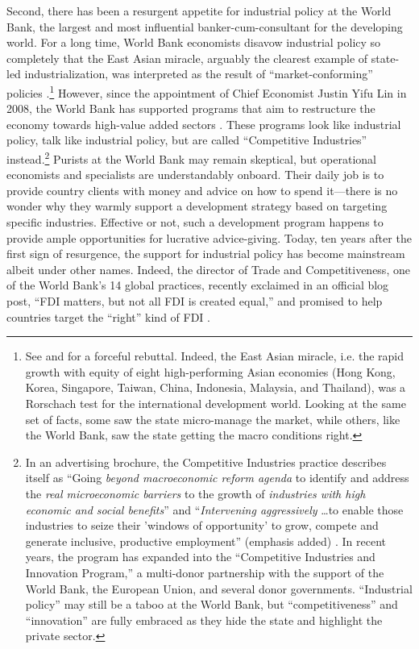 Second, there has been a resurgent appetite for industrial policy at the World
Bank, the largest and most influential banker-cum-consultant for the developing
world. For a long time, World Bank economists disavow industrial policy so
completely that the East Asian miracle, arguably the clearest example of
state-led industrialization, was interpreted as the result of
``market-conforming'' policies \citep[355]{WorldBank1993}.\footnote{See
  \citet{Amsden1994} and \citet{Rodrik1994} for a forceful rebuttal. Indeed, the
  East Asian miracle, i.e. the rapid growth with equity of eight high-performing
  Asian economies (Hong Kong, Korea, Singapore, Taiwan, China, Indonesia,
  Malaysia, and Thailand), was a Rorschach test for the international
  development world. Looking at the same set of facts, some saw the state
  micro-manage the market, while others, like the World Bank, saw the state
  getting the macro conditions right.} However, since the appointment of Chief
Economist Justin Yifu Lin in 2008, the World Bank has supported programs that
aim to restructure the economy towards high-value added sectors
\citep{Wade2012}. These programs look like industrial policy, talk like
industrial policy, but are called ``Competitive Industries''
instead.\footnote{In an advertising brochure, the Competitive Industries
  practice describes itself as ``Going \textit{beyond macroeconomic reform
    agenda} to identify and address the \textit{real microeconomic barriers} to
  the growth of \textit{industries with high economic and social benefits}'' and
  ``\textit{Intervening aggressively} \ldots to enable those industries to seize
  their 'windows of opportunity' to grow, compete and generate inclusive,
  productive employment'' (emphasis added) \citep{WorldBank2011}. In recent
  years, the program has expanded into the ``Competitive Industries and
  Innovation Program,'' a multi-donor partnership with the support of the World
  Bank, the European Union, and several donor governments. ``Industrial policy''
  may still be a taboo at the World Bank, but ``competitiveness'' and
  ``innovation'' are fully embraced as they hide the state and highlight the
  private sector.} Purists at the World Bank may remain skeptical, but
operational economists and specialists are understandably onboard. Their daily
job is to provide country clients with money and advice on how to spend
it---there is no wonder why they warmly support a development strategy based on
targeting specific industries. Effective or not, such a development program
happens to provide ample opportunities for lucrative advice-giving. Today, ten
years after the first sign of resurgence, the support for industrial policy has
become mainstream albeit under other names. Indeed, the director of Trade and
Competitiveness, one of the World Bank's 14 global practices, recently exclaimed
in an official blog post, ``FDI matters, but not all FDI is created equal,'' and
promised to help countries target the ``right'' kind of FDI \citep{Fruman2016}.

